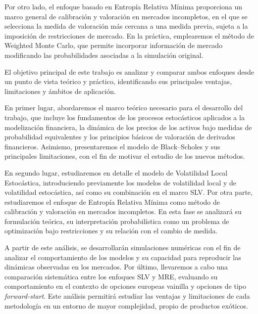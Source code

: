 Por otro lado, el enfoque basado en Entropía Relativa Mínima proporciona un marco general de calibración y valoración en mercados incompletos, en el que se selecciona la medida de valoración más cercana a una medida previa, sujeta a la imposición de restricciones de mercado. En la práctica, emplearemos el método de Weighted Monte Carlo, que permite incorporar información de mercado modificando las probabilidades asociadas a la simulación original. \medskip

El objetivo principal de este trabajo es analizar y comparar ambos enfoques desde un punto de vista teórico y práctico, identificando sus principales ventajas, limitaciones y ámbitos de aplicación.

En primer lugar, abordaremos el marco teórico necesario para el desarrollo del trabajo, que incluye los fundamentos de los procesos estocásticos aplicados a la modelización financiera, la dinámica de los precios de los activos bajo medidas de probabilidad equivalentes y los principios básicos de valoración de derivados financieros. Asimismo, presentaremos el modelo de Black--Scholes y sus principales limitaciones, con el fin de motivar el estudio de los nuevos métodos. \medskip

En segundo lugar, estudiaremos en detalle el modelo de Volatilidad Local Estocástica, introduciendo previamente los modelos de volatilidad local y de volatilidad estocástica, así como su combinación en el marco SLV. Por otra parte, estudiaremos el enfoque de Entropía Relativa Mínima como método de calibración y valoración en mercados incompletos. En esta fase se analizará su formulación teórica, su interpretación probabilística como un problema de optimización bajo restricciones y su relación con el cambio de medida. \medskip

A partir de este análisis, se desarrollarán simulaciones numéricas con el fin de analizar el comportamiento de los modelos y su capacidad para reproducir las dinámicas observadas en los mercados. Por último, llevaremos a cabo una comparación sistemática entre los enfoques SLV y MRE, evaluando su comportamiento en el contexto de opciones europeas vainilla y opciones de tipo \textit{forward-start}. Este análisis permitirá estudiar las ventajas y limitaciones de cada metodología en un entorno de mayor complejidad, propio de productos exóticos.
